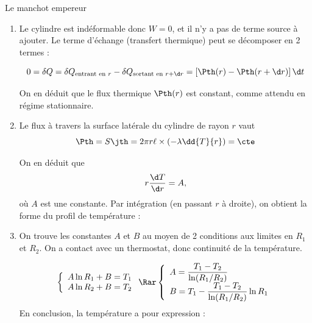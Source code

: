 \begin{exo}[PC][1][devoir]{Le manchot empereur}
\begin{quest}
{\begin{enumerate}
    \item {}
Le cylindre est indéformable donc $W=0$, et il n'y a pas de terme source à ajouter.
Le terme d'échange (transfert thermique) peut se décomposer en 2 termes : 

$$0=\delta Q=\delta Q_{\text{entrant en }r}-\delta Q_{\text{sortant en }r+\d r} = \left[ \Pth(r)-\Pth(r+\d r) \right] \d t$$

On en déduit que le flux thermique $\Pth(r)$ est constant, comme attendu en régime stationnaire.

\item {}
Le flux à travers la surface latérale du cylindre de rayon $r$ vaut 
$$
\Pth = S \jth = 2\pi r \ell\times \left(-\lambda \dd{T}{r}\right)=\cte$$

On en déduit que 
$$r\dfrac{\d T}{\d r}=A,$$ où $A$ est une constante.
Par intégration (en passant $r$ à droite), on obtient la forme du profil de température :
  \item {}
  On trouve les constantes $A$ et $B$ au moyen de 2 conditions aux limites en $R_1$ et $R_2$. On a contact avec un thermostat, donc continuité de la température.
  
  $$\left\{\begin{array}{l}
A\ln R_1+B=T_1\\
A\ln R_2+B=T_2\\
\end{array}
\right.
\Rar 
\left\{\begin{array}{l}
A=\dfrac{T_1-T_2}{\ln (R_1/R_2)}\\
B=T_1-\dfrac{T_1-T_2}{\ln (R_1/R_2)}\ln R_1
\end{array}
\right.
$$
En conclusion, la température a pour expression :
\end{enumerate}
}

\end{quest}
\end{exo}
